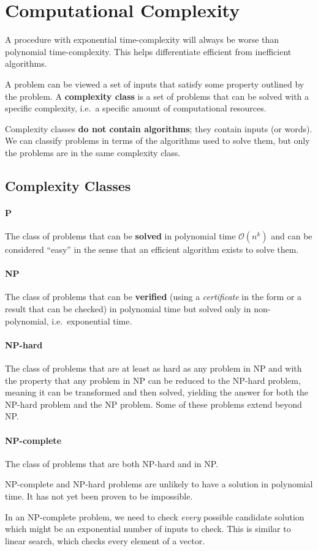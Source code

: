 \section{Computational Complexity}
A procedure with exponential time-complexity will always be worse than polynomial time-complexity. This helps differentiate efficient from inefficient algorithms.

A problem can be viewed a set of inputs that satisfy some property outlined by the problem. A \textbf{complexity class} is a set of problems that can be solved with a specific complexity, i.e.\ a specific amount of computational resources.

Complexity classes \textbf{do not contain algorithms}; they contain inputs (or words). We can classify problems in terms of the algorithms used to solve them, but only the problems are in the same complexity class.

\subsection{Complexity Classes}
\paragraph{P} The class of problems that can be \textbf{solved}  in polynomial time \( \mathcal{O}(n^k) \) and can be considered ``easy'' in the sense that an efficient algorithm exists to solve them.

\paragraph{NP} The class of problems that can be \textbf{verified} (using a \emph{certificate} in the form or a result that can be checked)  in polynomial time but solved only in non-polynomial, i.e.\ exponential time.

\paragraph{NP-hard} The class of problems that are at least as hard as any problem in NP and with the property that any problem in NP can be reduced to the NP-hard problem, meaning it can be transformed and then solved, yielding the answer for both the NP-hard problem and the NP problem. Some of these problems extend beyond NP.

\paragraph{NP-complete} The class of problems that are both NP-hard and in NP.

NP-complete and NP-hard problems are unlikely to have a solution in polynomial time. It has not yet been proven to be impossible.

In an NP-complete problem, we need to check \emph{every} possible candidate solution which might be an exponential number of inputs to check. This is similar to linear search, which checks every element of a vector.






